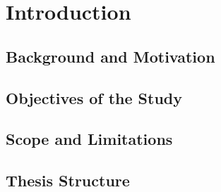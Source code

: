 
\chapter{Introduction}\label{chapter:introduction}

\section{Background and Motivation}\label{background:backgroundAndMotivation}
\section{Objectives of the Study}\label{objective:objectives}
\section{Scope and Limitations}\label{scope:scope}
\section{Thesis Structure}\label{thesis:thesis}